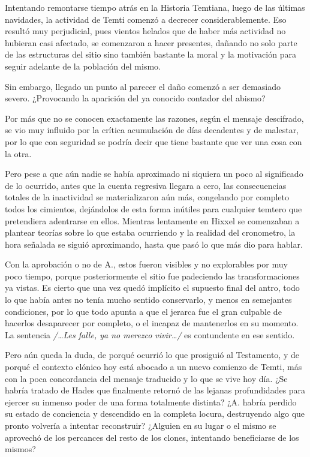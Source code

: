\documentclass[
]{book}
\begin{document}
Intentando remontarse tiempo atrás en la Historia Temtiana, luego de las últimas navidades, la actividad de Temti comenzó a decrecer considerablemente. Eso resultó muy perjudicial, pues vientos helados que de haber más actividad no hubieran casi afectado, se comenzaron a hacer presentes, dañando no solo parte de las estructuras del sitio sino también bastante la moral y la motivación para seguir adelante de la población del mismo.

Sin embargo, llegado un punto al parecer el daño comenzó a ser demasiado severo. ¿Provocando la aparición del ya conocido contador del abismo?

Por más que no se conocen exactamente las razones, según el mensaje descifrado, se vio muy influido por la crítica acumulación de días decadentes y de malestar, por lo que con seguridad se podría decir que tiene bastante que ver una cosa con la otra.

Pero pese a que aún nadie se había aproximado ni siquiera un poco al significado de lo ocurrido, antes que la cuenta regresiva llegara a cero, las consecuencias totales de la inactividad se materializaron aún más, congelando por completo todos los cimientos, dejándolos de esta forma inútiles para cualquier temtero que pretendiera adentrarse en ellos. Mientras lentamente en Hixxel se comenzaban a plantear teorías sobre lo que estaba ocurriendo y la realidad del cronometro, la hora señalada se siguió aproximando, hasta que pasó lo que más dio para hablar.

Con la aprobación o no de A., estos fueron visibles y no explorables por muy poco tiempo, porque posteriormente el sitio fue padeciendo las transformaciones ya vistas. Es cierto que una vez quedó implícito el supuesto final del antro, todo lo que había antes no tenía mucho sentido conservarlo, y menos en semejantes condiciones, por lo que todo apunta a que el jerarca fue el gran culpable de hacerlos desaparecer por completo, o el incapaz de mantenerlos en su momento. La sentencia \emph{/\ldots Les falle, ya no merezco vivir\ldots/} es contundente en ese sentido.

Pero aún queda la duda, de porqué ocurrió lo que prosiguió al Testamento, y de porqué el contexto clónico hoy está abocado a un nuevo comienzo de Temti, más con la poca concordancia del mensaje traducido y lo que se vive hoy día. ¿Se habría tratado de Hades que finalmente retornó de las lejanas profundidades para ejercer su inmenso poder de una forma totalmente distinta? ¿A. habría perdido su estado de conciencia y descendido en la completa locura, destruyendo algo que pronto volvería a intentar reconstruir? ¿Alguien en su lugar o el mismo se aprovechó de los percances del resto de los clones, intentando beneficiarse de los mismos?
\end{document}
